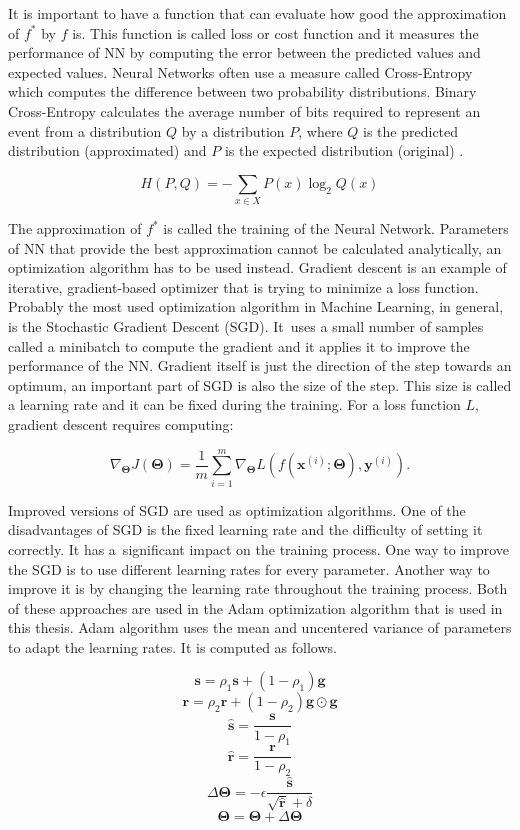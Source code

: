 It is important to have a function that can evaluate how good the approximation of $f^*$ by $f$ is. This function is called loss or cost function and it measures the performance of NN by computing the error between the predicted values and expected values. Neural Networks often use a measure called Cross-Entropy which computes the difference between two probability distributions. Binary Cross-Entropy calculates the average number of bits required to represent an event from a distribution $Q$ by a distribution $P$, where $Q$ is the predicted distribution (approximated) and $P$ is the expected distribution (original) \cite{murphy2013machine}.

$$H(P, Q) = -\sum\limits_{x \in X} P(x) \log_2 Q(x) $$

The approximation of $f^*$ is called the training of the Neural Network. Parameters of NN that provide the best approximation cannot be calculated analytically, an optimization algorithm has to be used instead. Gradient descent is an example of iterative, gradient-based optimizer that is trying to minimize a loss function. Probably the most used optimization algorithm in Machine Learning, in general, is the Stochastic Gradient Descent (SGD). It~uses a small number of samples called a minibatch to compute the gradient and it applies it to improve the performance of the NN. Gradient itself is just the direction of the step towards an optimum, an important part of SGD is also the size of the step. This size is called a learning rate and it can be fixed during the training. For a loss function $L$, gradient descent requires computing:

$$ \nabla_{\pmb \Theta} J(\pmb \Theta) = \frac{1}{m} \sum\limits_{i=1}^{m} \nabla_{\pmb \Theta} L(f(\pmb {x}^{(i)}; \pmb \Theta), \pmb {y}^{(i)}) .$$

Improved versions of SGD are used as optimization algorithms. One of the disadvantages of SGD is the fixed learning rate and the difficulty of setting it correctly. It has a~significant impact on the training process. One way to improve the SGD is to use different learning rates for every parameter. Another way to improve it is by changing the learning rate throughout the training process. Both of these approaches are used in the Adam optimization algorithm that is used in this thesis. Adam algorithm uses the mean and uncentered variance of parameters to adapt the learning rates. It is computed as follows.

$$ \pmb s = \rho_1 \pmb s + (1 - \rho_1) \pmb g$$
$$ \pmb r = \rho_2 \pmb r + (1 - \rho_2) \pmb g \odot \pmb g$$
$$ \hat{\pmb s} = \frac{\pmb s}{1 - \rho_1} $$
$$ \hat{\pmb r} = \frac{\pmb r}{1 - \rho_2} $$
$$ \Delta \pmb \Theta = - \epsilon \frac{\hat{\pmb s}}{\sqrt{\hat{\pmb r}} + \delta} $$
$$ \pmb \Theta = \pmb \Theta + \Delta \pmb \Theta $$

